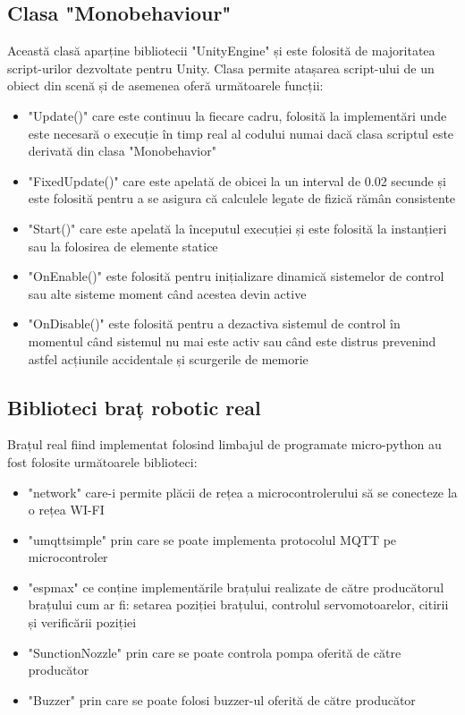 \subsection{Clasa "Monobehaviour"}
Această clasă aparține bibliotecii "UnityEngine" și este folosită de majoritatea script-urilor dezvoltate pentru Unity. Clasa permite atașarea script-ului de un obiect din scenă și de asemenea oferă următoarele funcții:
\begin{itemize}
	\item "Update()" care este continuu la fiecare cadru, folosită la implementări unde este necesară o execuție în timp real al codului numai dacă clasa scriptul este derivată din clasa "Monobehavior"
	\item "FixedUpdate()" care este apelată de obicei la un interval de 0.02 secunde și este folosită pentru a se asigura că calculele legate de fizică rămân consistente 
	\item "Start()" care este apelată la începutul execuției și este folosită la instanțieri sau la folosirea de elemente statice
	\item "OnEnable()" este folosită pentru inițializare dinamică sistemelor de control sau alte sisteme moment când acestea devin active
	\item "OnDisable()" este folosită pentru a dezactiva sistemul de control în momentul când sistemul nu mai este activ sau când este distrus prevenind astfel acțiunile accidentale și scurgerile de memorie
\end{itemize}

\subsection{Biblioteci braț robotic real}
Brațul real fiind implementat folosind limbajul de programate micro-python au fost folosite următoarele biblioteci:
\begin{itemize}
	\item "network" care-i permite plăcii de rețea a microcontrolerului să se conecteze la o rețea WI-FI
	\item "umqttsimple" prin care se poate implementa protocolul MQTT pe microcontroler
	\item "espmax" ce conține implementările brațului realizate de către producătorul brațului cum ar fi: setarea poziției brațului, controlul servomotoarelor, citirii și verificării poziției
	\item "SunctionNozzle" prin care se poate controla pompa oferită de către producător
	\item "Buzzer" prin care se poate folosi buzzer-ul  oferită de către producător
\end{itemize}




